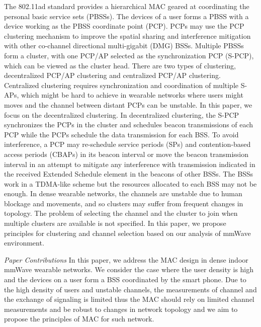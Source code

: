 \documentclass[10pt, conference, letterpaper]{IEEEtran}
\begin{document}
The 802.11ad standard provides a hierarchical MAC geared at coordinating the personal basic service sets (PBSSs). The devices of a user forms a PBSS with a device working as the PBSS coordinate point (PCP). PCPs may use the PCP clustering mechanism to improve the spatial sharing and interference mitigation with other co-channel directional multi-gigabit (DMG) BSSs. Multiple PBSSs form a cluster, with one PCP/AP selected as the synchronization PCP (S-PCP), which can be viewed as the cluster head.
There are two types of clustering, decentralized PCP/AP clustering and centralized PCP/AP clustering. Centralized clustering requires synchronization and coordination of multiple S-APs, which might be hard to achieve in wearable networks where users might moves and the channel between distant PCPs can be unstable. In this paper, we focus on the decentralized clustering. In decentralized clustering, the 
S-PCP synchronizes the PCPs in the cluster and schedules beacon transmissions of each PCP while the PCPs schedule the data transmission for each BSS. To avoid interference, a PCP may re-schedule service periods (SPs) and contention-based access periods (CBAPs) in its beacon interval or move the beacon transmission interval in an attempt to mitigate any interference with transmission indicated in the received Extended Schedule element in the beacons of other BSSs. The BSSs work in a TDMA-like scheme but the resources allocated to each BSS may not be enough. In dense wearable networks, the channels are unstable due to human blockage and movements, and so clusters may suffer from frequent changes in topology. The problem of selecting the channel and the cluster to join when multiple clusters are available is not specified. In this paper, we propose principles for clustering and channel selection based on our analysis of mmWave environment.

\emph{Paper Contributions}
In this paper, we address the MAC design in dense indoor mmWave wearable networks. We consider the case where the user density is high and the devices on a user form a BSS coordinated by the smart phone. Due to the high density of users and unstable channels, the measurements of channel and the exchange of signaling is limited thus the MAC should rely on limited channel measurements and be robust to changes in network topology and we aim to propose the principles of MAC for such network.
\end{document}
